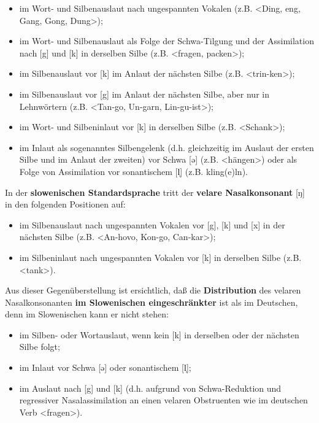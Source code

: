 \documentclass[
  letterpaper,
]{scrbook}
\begin{document}
\begin{itemize}
\item
  im Wort- und Silbenauslaut nach ungespannten Vokalen (z.B.
  \textless Ding, eng, Gang, Gong, Dung\textgreater);
\item
  im Wort- und Silbenauslaut als Folge der Schwa-Tilgung und der
  Assimilation nach {[}g{]} und {[}k{]} in derselben Silbe (z.B.
  \textless fragen, packen\textgreater);
\item
  im Silbenauslaut vor {[}k{]} im Anlaut der nächsten Silbe (z.B.
  \textless trin-ken\textgreater);
\item
  im Silbenauslaut vor {[}g{]} im Anlaut der nächsten Silbe, aber nur in
  Lehnwörtern (z.B. \textless Tan-go, Un-garn, Lin-gu-ist\textgreater);
\item
  im Wort- und Silbeninlaut vor {[}k{]} in derselben Silbe (z.B.
  \textless Schank\textgreater);
\item
  im Inlaut als sogenanntes Silbengelenk (d.h. gleichzeitig im Auslaut
  der ersten Silbe und im Anlaut der zweiten) vor Schwa {[}ə{]} (z.B.
  \textless hängen\textgreater) oder als Folge von Assimilation vor
  sonantischem {[}l̩{]} (z.B. kling(e)ln).
\end{itemize}

In der \textbf{slowenischen Standardsprache} tritt der \textbf{velare
Nasalkonsonant} {[}ŋ{]} in den folgenden Positionen auf:

\begin{itemize}
\item
  im Silbenauslaut nach ungespannten Vokalen vor {[}g{]}, {[}k{]} und
  {[}x{]} in der nächsten Silbe (z.B. \textless An-hovo, Kon-go,
  Can-kar\textgreater);
\item
  im Silbeninlaut nach ungespannten Vokalen vor {[}k{]} in derselben
  Silbe (z.B. \textless tank\textgreater).
\end{itemize}

Aus dieser Gegenüberstellung ist ersichtlich, daß die
\textbf{Distribution} des velaren Nasalkonsonanten \textbf{im
Slowenischen eingeschränkter} ist als im Deutschen, denn im Slowenischen
kann er nicht stehen:

\begin{itemize}
\item
  im Silben- oder Wortauslaut, wenn kein {[}k{]} in derselben oder der
  nächsten Silbe folgt;
\item
  im Inlaut vor Schwa {[}ə{]} oder sonantischem {[}l̩{]};
\item
  im Auslaut nach {[}g{]} und {[}k{]} (d.h. aufgrund von Schwa-Reduktion
  und regressiver Nasalassimilation an einen velaren Obstruenten wie im
  deutschen Verb \textless fragen\textgreater).
\end{itemize}
\end{document}
